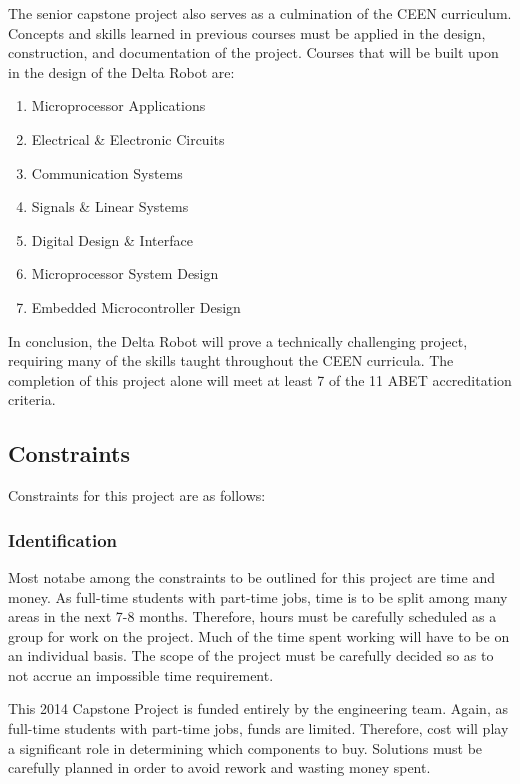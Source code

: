 \documentclass[11pt]{report}
\begin{document}
\newpage
\par The senior capstone project also serves as a culmination of the CEEN curriculum. Concepts and skills learned in previous courses must be applied in the design, construction, and documentation of the project. Courses that will be built upon in the design of the Delta Robot are:
\begin{enumerate} \parskip2pt
	\item Microprocessor Applications
	\item Electrical \& Electronic Circuits
	\item Communication Systems
	\item Signals \& Linear Systems
	\item Digital Design \& Interface
	\item Microprocessor System Design
	\item Embedded Microcontroller Design
\end{enumerate}

\par In conclusion, the Delta Robot will prove a technically challenging project, requiring many of the skills taught throughout the CEEN curricula. The completion of this project alone will meet at least 7 of the 11 ABET accreditation criteria.

\subsection{Constraints}
Constraints for this project are as follows:

\subsubsection{ Identification}
\par Most notabe among the constraints to be outlined for this project are time and money. As full-time students with part-time jobs, time is to be split among many areas in the next 7-8 months. Therefore, hours must be carefully scheduled as a group for work on the project. Much of the time spent working will have to be on an individual basis. The scope of the project must be carefully decided so as to not accrue an impossible time requirement. 
\par This 2014 Capstone Project is funded entirely by the engineering team. Again, as full-time students with part-time jobs, funds are limited. Therefore, cost will play a significant role in determining which components to buy. Solutions must be carefully planned in order to avoid rework and wasting money spent.
\end{document}

